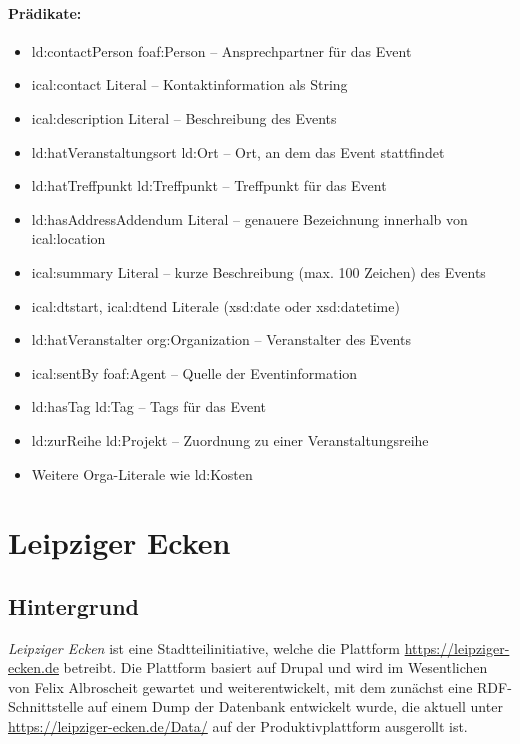 \documentclass[a4paper,11pt]{article}
\begin{document}
\paragraph{Prädikate:}
\begin{itemize}
\item ld:contactPerson foaf:Person – Ansprechpartner für das Event
\item ical:contact Literal – Kontaktinformation als String
\item ical:description Literal – Beschreibung des Events
\item ld:hatVeranstaltungsort ld:Ort – Ort, an dem das Event stattfindet
\item ld:hatTreffpunkt ld:Treffpunkt – Treffpunkt für das Event
\item ld:hasAddressAddendum Literal – genauere Bezeichnung innerhalb von
  ical:location
\item ical:summary Literal – kurze Beschreibung (max. 100 Zeichen) des Events
\item ical:dtstart, ical:dtend Literale (xsd:date oder xsd:datetime)
\item ld:hatVeranstalter org:Organization – Veranstalter des Events
\item ical:sentBy foaf:Agent – Quelle der Eventinformation
\item ld:hasTag ld:Tag – Tags für das Event
\item ld:zurReihe ld:Projekt – Zuordnung zu einer Veranstaltungsreihe
\item Weitere Orga-Literale wie ld:Kosten
\end{itemize}
\newpage

\section{Leipziger Ecken}

\subsection{Hintergrund}

\emph{Leipziger Ecken} ist eine Stadtteilinitiative, welche die Plattform
\url{https://leipziger-ecken.de} betreibt. Die Plattform basiert auf Drupal
und wird im Wesentlichen von Felix Albroscheit gewartet und weiterentwickelt,
mit dem zunächst eine RDF-Schnittstelle auf einem Dump der Datenbank
entwickelt wurde, die aktuell unter \url{https://leipziger-ecken.de/Data/} auf
der Produktivplattform ausgerollt ist. 
\end{document}
